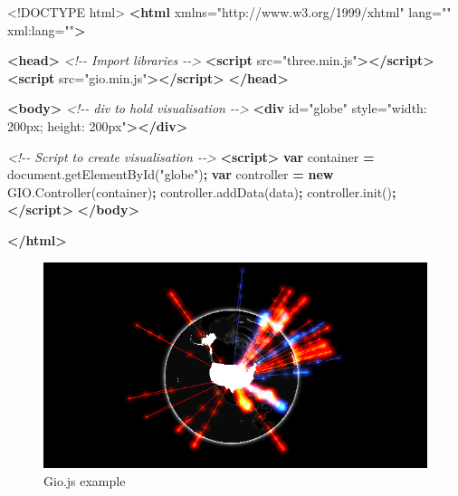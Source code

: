 \documentclass[
]{krantz}
\makeatletter
\newenvironment{Shaded}{\begin{snugshade}}{\end{snugshade}}
\newcommand{\AttributeTok}[1]{\textcolor[rgb]{0.61,0.61,0.61}{#1}}
\newcommand{\CommentTok}[1]{\textcolor[rgb]{0.37,0.37,0.37}{\textit{#1}}}
\newcommand{\DataTypeTok}[1]{\textcolor[rgb]{0.27,0.27,0.27}{#1}}
\newcommand{\KeywordTok}[1]{\textcolor[rgb]{0.27,0.27,0.27}{\textbf{#1}}}
\newcommand{\NormalTok}[1]{#1}
\newcommand{\OperatorTok}[1]{\textcolor[rgb]{0.43,0.43,0.43}{\textbf{#1}}}
\newcommand{\OtherTok}[1]{\textcolor[rgb]{0.37,0.37,0.37}{#1}}
\newcommand{\StringTok}[1]{\textcolor[rgb]{0.5,0.5,0.5}{#1}}
\newcommand{\VariableTok}[1]{\textcolor[rgb]{0,0,0}{#1}}
\newenvironment{kframe}{%
\medskip{}
\setlength{\fboxsep}{.8em}
 \def\at@end@of@kframe{}%
 \ifinner\ifhmode%
  \def\at@end@of@kframe{\end{minipage}}%
  \begin{minipage}{\columnwidth}%
 \fi\fi%
 \def\FrameCommand##1{\hskip\@totalleftmargin \hskip-\fboxsep
 \colorbox{shadecolor}{##1}\hskip-\fboxsep
     \hskip-\linewidth \hskip-\@totalleftmargin \hskip\columnwidth}%
 \MakeFramed {\advance\hsize-\width
   \@totalleftmargin\z@ \linewidth\hsize
   \@setminipage}}%
 {\par\unskip\endMakeFramed%
 \at@end@of@kframe}
\renewenvironment{Shaded}{\begin{kframe}}{\end{kframe}}
\makeatother
\begin{document}
\begin{Shaded}
\begin{Highlighting}[]
\DataTypeTok{<!DOCTYPE }\NormalTok{html}\DataTypeTok{>}
\KeywordTok{<html}\OtherTok{ xmlns=}\StringTok{"http://www.w3.org/1999/xhtml"}\OtherTok{ lang=}\StringTok{""}\OtherTok{ xml:lang=}\StringTok{""}\KeywordTok{>}

\KeywordTok{<head>}
  \CommentTok{<!{-}{-} Import libraries {-}{-}>}
  \KeywordTok{<script}\OtherTok{ src=}\StringTok{"three.min.js"}\KeywordTok{></script>}
  \KeywordTok{<script}\OtherTok{ src=}\StringTok{"gio.min.js"}\KeywordTok{></script>}
\KeywordTok{</head>}

\KeywordTok{<body>}
  \CommentTok{<!{-}{-} div to hold visualisation {-}{-}>}
  \KeywordTok{<div}\OtherTok{ id=}\StringTok{"globe"}\OtherTok{ style=}\StringTok{"width: 200px; height: 200px"}\KeywordTok{></div>}

  \CommentTok{<!{-}{-} Script to create visualisation {-}{-}>}
  \KeywordTok{<script>}
    \KeywordTok{var}\NormalTok{ container }\OperatorTok{=} \VariableTok{document}\NormalTok{.}\AttributeTok{getElementById}\NormalTok{(}\StringTok{"globe"}\NormalTok{)}\OperatorTok{;}
    \KeywordTok{var}\NormalTok{ controller }\OperatorTok{=} \KeywordTok{new} \VariableTok{GIO}\NormalTok{.}\AttributeTok{Controller}\NormalTok{(container)}\OperatorTok{;}
    \VariableTok{controller}\NormalTok{.}\AttributeTok{addData}\NormalTok{(data)}\OperatorTok{;}
    \VariableTok{controller}\NormalTok{.}\AttributeTok{init}\NormalTok{()}\OperatorTok{;}
  \KeywordTok{</script>}
\KeywordTok{</body>}

\KeywordTok{</html>}
\end{Highlighting}
\end{Shaded}

\begin{figure}[t]

{\centering \includegraphics[width=1\linewidth]{images/gio-example} 

}

\caption{Gio.js example}\label{fig:gio-example}
\end{figure}
\end{document}
